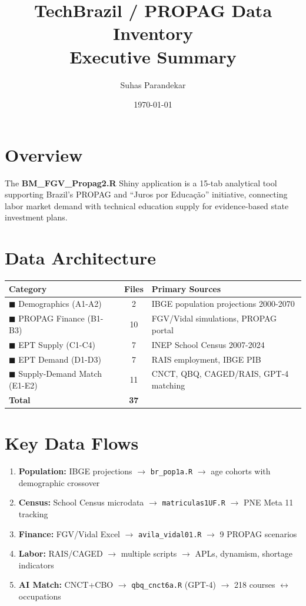 \documentclass[10pt]{article}
\title{\textbf{TechBrazil / PROPAG Data Inventory}\\[0.3em]\Large Executive Summary}
\author{Suhas Parandekar}
\date{\today}
\begin{document}
\maketitle

\section*{Overview}
\vspace{-0.5em}
The \textbf{BM\_FGV\_Propag2.R} Shiny application is a 15-tab analytical tool supporting Brazil's PROPAG and ``Juros por Educação'' initiative, connecting labor market demand with technical education supply for evidence-based state investment plans.

\section*{Data Architecture}

\begin{center}
\begin{tabular}{lcp{8cm}}
\toprule
\textbf{Category} & \textbf{Files} & \textbf{Primary Sources} \\
\midrule
\textcolor{tabA}{$\blacksquare$} Demographics (A1-A2) & 2 & IBGE population projections 2000-2070 \\
\textcolor{tabB}{$\blacksquare$} PROPAG Finance (B1-B3) & 10 & FGV/Vidal simulations, PROPAG portal \\
\textcolor{tabC}{$\blacksquare$} EPT Supply (C1-C4) & 7 & INEP School Census 2007-2024 \\
\textcolor{tabD}{$\blacksquare$} EPT Demand (D1-D3) & 7 & RAIS employment, IBGE PIB \\
\textcolor{tabE}{$\blacksquare$} Supply-Demand Match (E1-E2) & 11 & CNCT, QBQ, CAGED/RAIS, GPT-4 matching \\
\midrule
\textbf{Total} & \textbf{37} & \\
\bottomrule
\end{tabular}
\end{center}

\section*{Key Data Flows}
\vspace{-0.5em}
\small
\begin{enumerate}[nosep,leftmargin=*]
\item \textbf{Population:} IBGE projections $\rightarrow$ \texttt{br\_pop1a.R} $\rightarrow$ age cohorts with demographic crossover
\item \textbf{Census:} School Census microdata $\rightarrow$ \texttt{matriculas1UF.R} $\rightarrow$ PNE Meta 11 tracking
\item \textbf{Finance:} FGV/Vidal Excel $\rightarrow$ \texttt{avila\_vidal01.R} $\rightarrow$ 9 PROPAG scenarios
\item \textbf{Labor:} RAIS/CAGED $\rightarrow$ multiple scripts $\rightarrow$ APLs, dynamism, shortage indicators
\item \textbf{AI Match:} CNCT+CBO $\rightarrow$ \texttt{qbq\_cnct6a.R} (GPT-4) $\rightarrow$ 218 courses $\leftrightarrow$ occupations
\end{enumerate}
\end{document}
